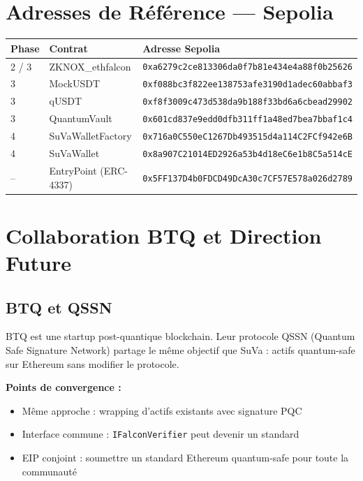 \documentclass[11pt,a4paper]{article}
\begin{document}
\section{Adresses de Référence --- Sepolia}

\begin{longtable}{@{}p{2cm}p{4cm}p{8cm}@{}}
\toprule
\textbf{Phase} & \textbf{Contrat} & \textbf{Adresse Sepolia} \\
\midrule
\endhead
2 / 3 & ZKNOX\_ethfalcon & \texttt{0xa6279c2ce813306da0f7b81e434e4a88f0b25626} \\
3 & MockUSDT & \texttt{0xf088bc3f822ee138753afe3190d1adec60abbaf3} \\
3 & qUSDT & \texttt{0xf8f3009c473d538da9b188f33bd6a6cbead29902} \\
3 & QuantumVault & \texttt{0x601cd837e9edd0dfb311ff1a48ed7bea7bbaf1c4} \\
4 & SuVaWalletFactory & \texttt{0x716a0C550eC1267Db493515d4a114C2FCf942e6B} \\
4 & SuVaWallet & \texttt{0x8a907C21014ED2926a53b4d18eC6e1b8C5a514cE} \\
-- & EntryPoint (ERC-4337) & \texttt{0x5FF137D4b0FDCD49DcA30c7CF57E578a026d2789} \\
\bottomrule
\end{longtable}

\section{Collaboration BTQ et Direction Future}

\subsection{BTQ et QSSN}

BTQ est une startup post-quantique blockchain. Leur protocole QSSN (Quantum Safe Signature Network) partage le même objectif que SuVa : actifs quantum-safe sur Ethereum sans modifier le protocole.

\textbf{Points de convergence :}
\begin{itemize}
  \item Même approche : wrapping d'actifs existants avec signature PQC
  \item Interface commune : \texttt{IFalconVerifier} peut devenir un standard
  \item EIP conjoint : soumettre un standard Ethereum quantum-safe pour toute la communauté
\end{itemize}
\end{document}
